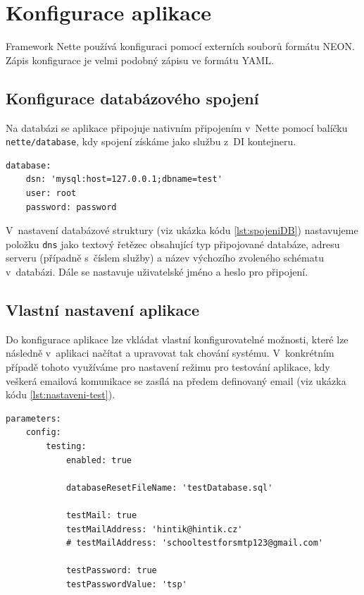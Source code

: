 \documentclass[czech,BP]{thesiskiv}
\begin{document}
	\section{Konfigurace aplikace}
	\par Framework Nette používá konfiguraci pomocí externích souborů formátu NEON. Zápis konfigurace je velmi podobný zápisu ve formátu YAML.
	\subsection{Konfigurace databázového spojení}
	\par Na databázi se aplikace připojuje nativním připojením v~Nette pomocí balíčku \texttt{nette/database}, kdy spojení získáme jako službu z~DI kontejneru.
\begin{minipage}{\linewidth}
		
	\begin{lstlisting}[caption={Konfigurace databázového spojení},label={lst:spojeniDB}]
database:
	dsn: 'mysql:host=127.0.0.1;dbname=test'
	user: root
	password: password
\end{lstlisting}
\end{minipage}
	\par V~nastavení databázové struktury (viz ukázka kódu \ref{lst:spojeniDB}) nastavujeme položku \texttt{dns} jako textový řetězec obsahující typ připojované databáze, adresu serveru (případně s~číslem služby) a název výchozího zvoleného schématu v~databázi. Dále se nastavuje uživatelské jméno a heslo pro připojení.
	\subsection{Vlastní nastavení aplikace}
	\par Do konfigurace aplikace lze vkládat vlastní konfigurovatelné možnosti, které lze následně v~aplikaci načítat a upravovat tak chování systému. V~konkrétním případě tohoto využíváme pro nastavení režimu pro testování aplikace, kdy veškerá emailová komunikace se zasílá na předem definovaný email (viz ukázka kódu \ref{lst:nastaveni-test}).
		\begin{lstlisting}[caption={Konfigurace testovacího režimu},label={lst:nastaveni-test}]
parameters:
	config:
		testing:
			enabled: true
			
			databaseResetFileName: 'testDatabase.sql'
			
			testMail: true
			testMailAddress: 'hintik@hintik.cz'
			# testMailAddress: 'schooltestforsmtp123@gmail.com'
			
			testPassword: true
			testPasswordValue: 'tsp'
		\end{lstlisting}
\end{document}

